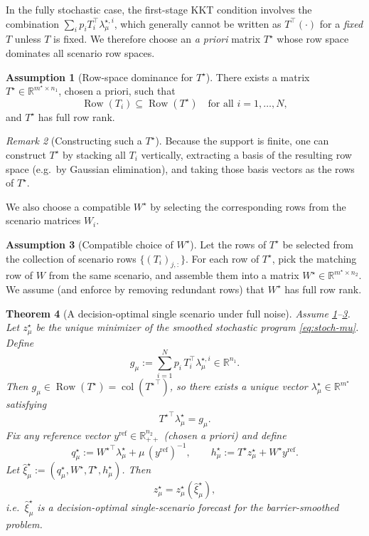 \documentclass[11pt]{article}
\theoremstyle{plain}
\newtheorem{theorem}{Theorem}[section]
\theoremstyle{definition}
\newtheorem{assumption}[theorem]{Assumption}
\theoremstyle{remark}
\newtheorem{remark}[theorem]{Remark}
\newcommand{\Row}{\operatorname{Row}}
\newcommand{\col}{\operatorname{col}}
\begin{document}
In the fully stochastic case, the first-stage KKT condition involves the combination $\sum_i p_i T_i^\top\lambda_{\mu}^{\star,i}$,
which generally cannot be written as $T^\top(\cdot)$ for a \emph{fixed} $T$ unless $T$ is fixed.
We therefore choose an \emph{a priori} matrix $T^\star$ whose row space dominates all scenario row spaces.

\begin{assumption}[Row-space dominance for $T^\star$]\label{ass:rowspace}
There exists a matrix $T^\star\in\mathbb{R}^{m^\star\times n_1}$, chosen a priori, such that
\[
\Row(T_i)\subseteq \Row(T^\star)\quad\text{for all }i=1,\dots,N,
\]
and $T^\star$ has full row rank.
\end{assumption}

\begin{remark}[Constructing such a $T^\star$]\label{rem:construct-Tstar}
Because the support is finite, one can construct $T^\star$ by stacking all $T_i$ vertically, extracting a basis of the resulting
row space (e.g.\ by Gaussian elimination), and taking those basis vectors as the rows of $T^\star$.
\end{remark}

We also choose a compatible $W^\star$ by selecting the corresponding rows from the scenario matrices $W_i$.

\begin{assumption}[Compatible choice of $W^\star$]\label{ass:Wstar}
Let the rows of $T^\star$ be selected from the collection of scenario rows $\{(T_i)_{j,:}\}$.
For each row of $T^\star$, pick the matching row of $W$ from the same scenario, and assemble them into a matrix
$W^\star\in\mathbb{R}^{m^\star\times n_2}$. We assume (and enforce by removing redundant rows) that $W^\star$ has full row rank.
\end{assumption}

\begin{theorem}[A decision-optimal single scenario under full noise]\label{thm:full-noise-barrier}
Assume \ref{ass:rowspace}--\ref{ass:Wstar}. Let $z_\mu^\star$ be the unique minimizer of the smoothed stochastic program
\eqref{eq:stoch-mu}.
Define
\[
g_\mu:=\sum_{i=1}^N p_i\,T_i^\top\lambda_{\mu}^{\star,i}\in\mathbb{R}^{n_1}.
\]
Then $g_\mu\in\Row(T^\star)=\col({T^\star}^\top)$, so there exists a unique vector $\lambda_\mu^\star\in\mathbb{R}^{m^\star}$
satisfying
\begin{equation}\label{eq:lambda-star-full-noise}
{T^\star}^\top\lambda_\mu^\star=g_\mu.
\end{equation}
Fix any reference vector $y^{\mathrm{ref}}\in\mathbb{R}^{n_2}_{++}$ (chosen a priori) and define
\begin{equation}\label{eq:full-noise-forecast}
q_\mu^\star:={W^\star}^\top\lambda_\mu^\star+\mu\,(y^{\mathrm{ref}})^{-1},
\qquad
h_\mu^\star:=T^\star z_\mu^\star+W^\star y^{\mathrm{ref}}.
\end{equation}
Let $\hat\xi_\mu^\star:=(q_\mu^\star,W^\star,T^\star,h_\mu^\star)$. Then
\[
z_\mu^\star = z_\mu^\star(\hat\xi_\mu^\star),
\]
i.e.\ $\hat\xi_\mu^\star$ is a decision-optimal single-scenario forecast for the barrier-smoothed problem.
\end{theorem}
\end{document}
